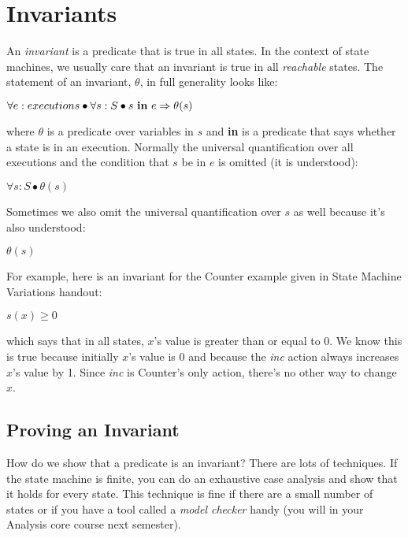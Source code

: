 \section{Invariants}

An {\em invariant} is a predicate that is true in all states.
In the context of state machines,
we usually care that an invariant is true
in all {\em reachable} states.
The statement of an invariant, $\theta$, in full generality looks like:

\begin{center}
$\forall e: executions \bullet \forall s: S \bullet s ~{\bf in}~ e \Rightarrow \theta(s)$
\end{center}

\noindent where $\theta$ is a predicate over variables in $s$
and {\bf in} is a predicate that says whether a state is in an execution.
Normally the universal quantification over all executions and the
condition that $s$ be in $e$ is omitted (it is understood):

\begin{center}
$\forall s: S \bullet \theta(s)$
\end{center}

\noindent Sometimes we also
omit the universal quantification over $s$ as well because it's also
understood:

\begin{center}
$\theta(s)$
\end{center}

For example, here is an invariant for the Counter example
given in State Machine Variations handout:

\begin{center}
$s(x) \geq 0$
\end{center}

\noindent which says that in all states, $x$'s value is greater than
or equal to 0.  We know this is true because initially $x$'s value
is 0 and because the {\em inc} action always increases $x$'s value
by 1.  Since {\em inc} is Counter's only action, there's no other way
to change $x$.

\subsection{Proving an Invariant}
How do we show that a predicate is an invariant?  There are lots of techniques.
If the state machine is finite, you can do an exhaustive case
analysis and show that
it holds for every state.  This technique is fine if there are a small
number of states or if you have a tool called a {\em model checker}
handy (you will in your Analysis core course next semester).

